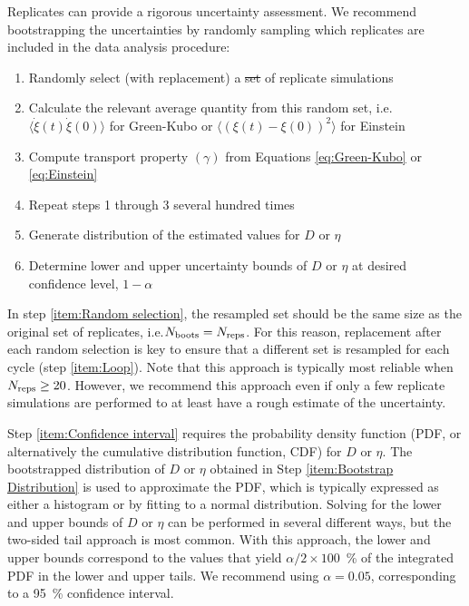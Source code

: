 \documentclass[9pt,bestpractices]{livecoms}
\providecommand{\DIFadd}[1]{{\protect\color{blue}\uwave{#1}}} %
\providecommand{\DIFdel}[1]{{\protect\color{red}\sout{#1}}}                      %
\providecommand{\DIFaddbegin}{} %
\providecommand{\DIFaddend}{} %
\providecommand{\DIFdelbegin}{} %
\providecommand{\DIFdelend}{} %
\begin{document}
Replicates can provide a rigorous uncertainty assessment. We recommend bootstrapping the uncertainties by randomly sampling which replicates are included in the data analysis procedure:

\begin{enumerate}
	\item Randomly select (with replacement) a \DIFdelbegin \DIFdel{set }\DIFdelend \DIFaddbegin \DIFadd{subset }\DIFaddend of replicate simulations \label{item:Random selection}
	\item Calculate the relevant average quantity from this random set, i.e.\DIFaddbegin \DIFadd{, }\DIFaddend $\langle\dot{\xi}(t)\dot{\xi}(0)\rangle$ for Green-Kubo or $\langle (\xi(t)-\xi(0))^2 \rangle$ for Einstein
	\item Compute transport property $(\gamma)$ from Equations \ref{eq:Green-Kubo} or \ref{eq:Einstein}
	\item Repeat steps 1 through 3 several hundred times \label{item:Loop}
	\item Generate distribution of the estimated values for $D$ or $\eta$ \label{item:Bootstrap Distribution}
	\item Determine lower and upper uncertainty bounds of $D$ or $\eta$ at desired confidence level, $1-\alpha$ \label{item:Confidence interval}
\end{enumerate}
In step \ref{item:Random selection}, the resampled set should be the same size as the original set of replicates, i.e.\DIFaddbegin \DIFadd{, }\DIFaddend $N_{\rm boots} = N_{\rm reps}$. For this reason, replacement after each random selection is key to ensure that a different set is resampled for each cycle (step \ref{item:Loop}). Note that this approach is typically most reliable when $N_{\rm reps} \ge 20$. However, we recommend this approach even if only a few replicate simulations are performed to at least have a rough estimate of the uncertainty.

Step \ref{item:Confidence interval} requires the probability density function (PDF, or alternatively the cumulative distribution function, CDF) for $D$ or $\eta$. The bootstrapped distribution of $D$ or $\eta$ obtained in Step \ref{item:Bootstrap Distribution} is used to approximate the PDF, which is typically expressed as either a histogram or by fitting to a normal distribution. Solving for the lower and upper bounds of $D$ or $\eta$ can be performed in several different ways, but the two-sided tail approach is most common. With this approach, the lower and upper bounds correspond to the values that yield $\alpha/2 \times 100$~\% of the integrated PDF in the lower and upper tails. We recommend using $\alpha = 0.05$, corresponding to a 95~\% confidence interval.
\end{document}
